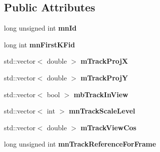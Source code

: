 \subsection*{Public Attributes}
\begin{DoxyCompactItemize}
\item 
long unsigned int {\bfseries mn\+Id}\hypertarget{classMultiColSLAM_1_1cMapPoint_aa8edb89ae453d2925e1db86d8d554c1b}{}\label{classMultiColSLAM_1_1cMapPoint_aa8edb89ae453d2925e1db86d8d554c1b}

\item 
long int {\bfseries mn\+First\+K\+Fid}\hypertarget{classMultiColSLAM_1_1cMapPoint_a1ecff0c1e481fae14ec4da9d31785a68}{}\label{classMultiColSLAM_1_1cMapPoint_a1ecff0c1e481fae14ec4da9d31785a68}

\item 
std\+::vector$<$ double $>$ {\bfseries m\+Track\+ProjX}\hypertarget{classMultiColSLAM_1_1cMapPoint_abc33374bf06ce7896c78b277d14caf70}{}\label{classMultiColSLAM_1_1cMapPoint_abc33374bf06ce7896c78b277d14caf70}

\item 
std\+::vector$<$ double $>$ {\bfseries m\+Track\+ProjY}\hypertarget{classMultiColSLAM_1_1cMapPoint_af50664f11197701f8d755db9af26407e}{}\label{classMultiColSLAM_1_1cMapPoint_af50664f11197701f8d755db9af26407e}

\item 
std\+::vector$<$ bool $>$ {\bfseries mb\+Track\+In\+View}\hypertarget{classMultiColSLAM_1_1cMapPoint_abaed43da98f6a7705ee0358acaf61583}{}\label{classMultiColSLAM_1_1cMapPoint_abaed43da98f6a7705ee0358acaf61583}

\item 
std\+::vector$<$ int $>$ {\bfseries mn\+Track\+Scale\+Level}\hypertarget{classMultiColSLAM_1_1cMapPoint_a70d26f1f6537846ed89d32bad009ce59}{}\label{classMultiColSLAM_1_1cMapPoint_a70d26f1f6537846ed89d32bad009ce59}

\item 
std\+::vector$<$ double $>$ {\bfseries m\+Track\+View\+Cos}\hypertarget{classMultiColSLAM_1_1cMapPoint_a6cf5eff2855a3c3cdc29404b85028632}{}\label{classMultiColSLAM_1_1cMapPoint_a6cf5eff2855a3c3cdc29404b85028632}

\item 
long unsigned int {\bfseries mn\+Track\+Reference\+For\+Frame}\hypertarget{classMultiColSLAM_1_1cMapPoint_a29c7970184168b3d6981a0be8ca2935e}{}\label{classMultiColSLAM_1_1cMapPoint_a29c7970184168b3d6981a0be8ca2935e}


\end{DoxyCompactItemize}
